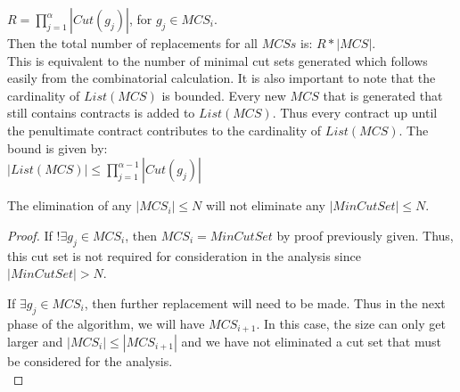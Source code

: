 $R = {\displaystyle \prod_{j=1}^{\alpha } |Cut(g_j)|}$, for $g_j \in MCS_i$. \\

Then the total number of replacements for all $MCSs$ is: $R*|MCS|$. \\

This is equivalent to the number of minimal cut sets generated which follows easily from the combinatorial calculation. It is also important to note that the cardinality of $List(MCS)$ is bounded. Every new $MCS$ that is generated that still contains contracts is added to $List(MCS)$. Thus every contract up until the penultimate contract contributes to the cardinality of $List(MCS)$. The bound is given by: \\

$|List(MCS)| \leq {\displaystyle \prod_{j=1}^{\alpha -1} |Cut(g_j)|}$\\

\begin{theorem} 
The elimination of any $|MCS_i| \leq N$ will not eliminate any $|MinCutSet| \leq N$. \\

\begin{proof} 

If $!\exists g_j \in MCS_i$, then $MCS_i = MinCutSet$ by proof previously given. Thus, this cut set is not required for consideration in the analysis since $|MinCutSet| > N$. 

If $\exists g_j \in MCS_i$, then further replacement will need to be made. Thus in the next phase of the algorithm, we will have $MCS_{i+1}$. In this case, the size can only get larger and $|MCS_i| \leq |MCS_{i+1}|$ and we have not eliminated a cut set that must be considered for the analysis. \\

\end{proof}
\end{theorem}


































